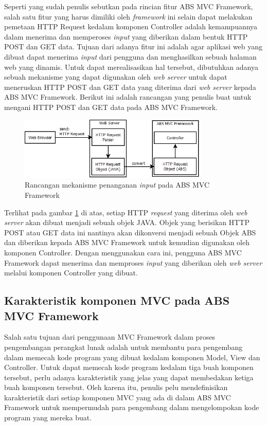 Seperti yang sudah penulis sebutkan pada rincian fitur ABS MVC Framework, salah satu fitur yang harus dimiliki oleh \textit{framework} ini selain dapat melakukan pemetaan HTTP Request kedalam komponen Controller adalah kemampuannya dalam menerima dan memperoses \textit{input} yang diberikan dalam bentuk HTTP POST dan GET data. Tujuan dari adanya fitur ini adalah agar aplikasi web yang dibuat dapat menerima \textit{input} dari pengguna dan menghasilkan sebuah halaman web yang dinamis. Untuk dapat merealisasikan hal tersebut, dibutuhkan adanya sebuah mekanisme yang dapat digunakan oleh \textit{web server} untuk dapat meneruskan HTTP POST dan GET data yang diterima dari \textit{web server} kepada ABS MVC Framework. Berikut ini adalah rancangan yang penulis buat untuk mengani HTTP POST dan GET data pada ABS MVC Framework.

\begin{figure}
    \centering
    \includegraphics[width=0.8\textwidth]{img/mvc-http-input.png}
    \caption{Rancangan mekanisme penanganan \textit{input} pada ABS MVC Framework}
    \label{fig:mvcHttpInputMechanism}
\end{figure}

Terlihat pada gambar \ref{fig:mvcHttpInputMechanism} di atas, setiap HTTP \textit{request} yang diterima oleh \textit{web server} akan dibuat menjadi sebuah objek JAVA. Objek yang berisikan HTTP POST atau GET data ini nantinya akan dikonversi menjadi sebuah Objek ABS dan diberikan kepada ABS MVC Framework untuk kemudian digunakan oleh komponen Controller. Dengan menggunakan cara ini, pengguna ABS MVC Framework dapat menerima dan memproses \textit{input} yang diberikan oleh \textit{web server} melalui komponen Controller yang dibuat.

\subsection{Karakteristik komponen MVC pada ABS MVC Framework}

Salah satu tujuan dari penggunaan MVC Framework dalam proses pengembangan perangkat lunak adalah untuk membantu para pengembang dalam memecah kode program yang dibuat kedalam komponen Model, View dan Controller. Untuk dapat memecah kode program kedalam tiga buah komponen tersebut, perlu adanya karakteristik yang jelas yang dapat membedakan ketiga buah komponen tersebut. Oleh karena itu, penulis pelu mendefinisikan karakteristik dari setiap komponen MVC yang ada di dalam ABS MVC Framework untuk mempermudah para pengembang dalam mengelompokan kode program yang mereka buat.


